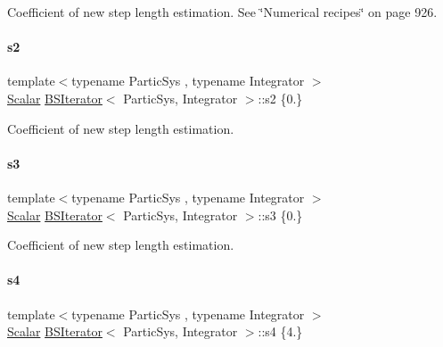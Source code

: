 Coefficient of new step length estimation. See \char`\"{}\+Numerical recipes\char`\"{} on page 926. 

\mbox{\label{class_b_s_iterator_ad1cdde25df6bca7a456c1908be54065f}} 
\paragraph{\texorpdfstring{s2}{s2}}
{\footnotesize\ttfamily template$<$typename Partic\+Sys , typename Integrator $>$ \\
\mbox{\hyperlink{class_b_s_iterator_a7857f8ff9032955ea4dcc22cd18ca7a1}{Scalar}} \mbox{\hyperlink{class_b_s_iterator}{B\+S\+Iterator}}$<$ Partic\+Sys, Integrator $>$\+::s2 \{0.\}\hspace{0.3cm}{\ttfamily [private]}}



Coefficient of new step length estimation. 

\mbox{\label{class_b_s_iterator_a10ea0bb96f7971e9c477daef1fda6e16}} 
\paragraph{\texorpdfstring{s3}{s3}}
{\footnotesize\ttfamily template$<$typename Partic\+Sys , typename Integrator $>$ \\
\mbox{\hyperlink{class_b_s_iterator_a7857f8ff9032955ea4dcc22cd18ca7a1}{Scalar}} \mbox{\hyperlink{class_b_s_iterator}{B\+S\+Iterator}}$<$ Partic\+Sys, Integrator $>$\+::s3 \{0.\}\hspace{0.3cm}{\ttfamily [private]}}



Coefficient of new step length estimation. 

\mbox{\label{class_b_s_iterator_a5b3bbb2d988a5d91030060508e3b4f66}} 
\paragraph{\texorpdfstring{s4}{s4}}
{\footnotesize\ttfamily template$<$typename Partic\+Sys , typename Integrator $>$ \\
\mbox{\hyperlink{class_b_s_iterator_a7857f8ff9032955ea4dcc22cd18ca7a1}{Scalar}} \mbox{\hyperlink{class_b_s_iterator}{B\+S\+Iterator}}$<$ Partic\+Sys, Integrator $>$\+::s4 \{4.\}\hspace{0.3cm}{\ttfamily [private]}}



